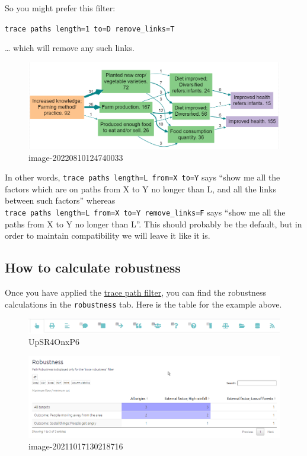 \documentclass[
]{book}
\begin{document}
So you might prefer this filter:

\texttt{trace\ paths\ length=1\ to=D\ remove\_links=T}

\ldots{} which will remove any such links.

\begin{figure}
\centering
\includegraphics{_assets/image-20220810124740033.png}
\caption{image-20220810124740033}
\end{figure}

In other words, \texttt{trace\ paths\ length=L\ from=X\ to=Y} says ``show me all the factors which are on paths from X to Y no longer than L, and all the links between such factors'' whereas \texttt{trace\ paths\ length=L\ from=X\ to=Y\ remove\_links=F} says ``show me all the paths from X to Y no longer than L''. This should probably be the default, but in order to maintain compatibility we will leave it like it is.

\hypertarget{how-to-calculate-robustness}{%
\subsection{How to calculate robustness}\label{how-to-calculate-robustness}}

Once you have applied the \protect\hyperlink{howtotracepathsandrobustness}{trace path filter}, you can find the robustness calculations in the \texttt{robustness} tab. Here is the table for the example above.

\begin{figure}
\centering
\includegraphics[width=6.77083in,height=\textheight]{_assets/UpSR4OnxP6.gif}
\caption{UpSR4OnxP6}
\end{figure}

\begin{figure}
\centering
\includegraphics[width=6.77083in,height=\textheight]{_assets/image-20211017130218716.png}
\caption{image-20211017130218716}
\end{figure}
\end{document}
